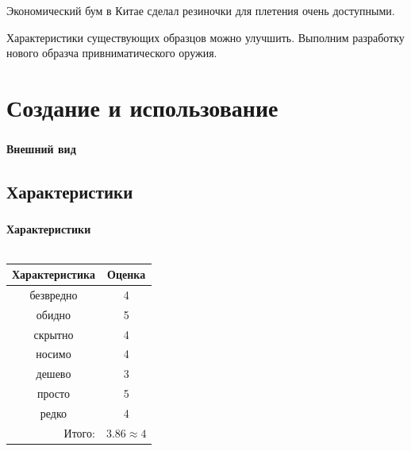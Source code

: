 Экономический бум в Китае сделал резиночки для плетения очень доступными.

\begin{frame}
    \begin{center}
        Характеристики существующих образцов можно улучшить. Выполним разработку нового образча привниматического оружия.
    \end{center}
\end{frame}

\section{Создание и использование}

\begin{frame}
    \frametitle{\myDevice}
    \framesubtitle{Внешний вид}
    
\end{frame}


\subsection{Характеристики}

\begin{frame}
    \frametitle{\myDevice}
    \framesubtitle{Характеристики}
    
    \begin{columns}
            \begin{center}
                \begin{tabular}{c|c}
                    \hline\hline
                    Характеристика              & Оценка\\ \hline\hline
                    безвредно                   & 4 \\
                    обидно                      & 5 \\
                    скрытно                     & 4 \\
                    носимо                      & 4 \\
                    дешево                      & 3 \\
                    просто                      & 5 \\ 
                    редко                       & 4 \\ \hline
                    \multicolumn{1}{r|}{Итого:} & $3.86\approx 4$ \\
                \end{tabular}
            \end{center}
    \end{columns}    
\end{frame}


